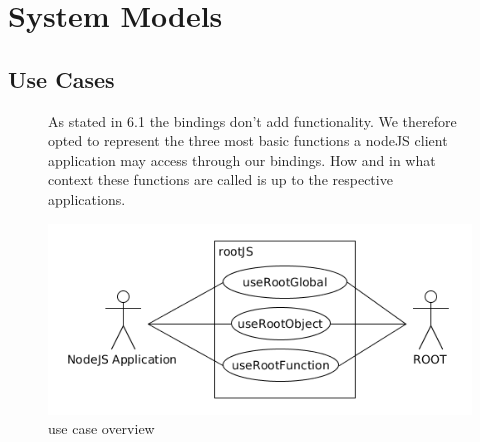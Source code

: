 \chapter{System Models}

\pagebreak[4]

\section{Use Cases}
\begin{figure}[htb]
	\centering
	As stated in 6.1 the bindings don't add functionality. We 
therefore opted to represent the three most basic functions a nodeJS 
client application may access through our bindings. How and in what 
context these functions are called is up to the respective applications. 

\includegraphics[width=16cm]{./latex/resources/usecaseOverview.png}
	\caption{use case overview}
\end{figure}

\pagebreak[4]



\pagebreak[4]

